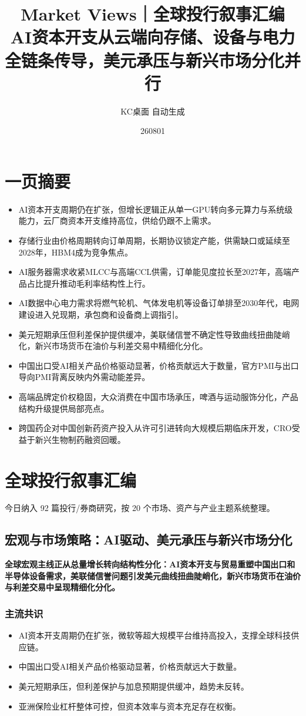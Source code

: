 \documentclass[11pt]{ctexart}
\title{\textbf{Market Views｜全球投行叙事汇编}\\[0.4em]{\large AI资本开支从云端向存储、设备与电力全链条传导，美元承压与新兴市场分化并行}}
\author{KC桌面 自动生成}
\date{260801}
\begin{document}
\maketitle
\tableofcontents
\newpage
\section{一页摘要}
\begin{itemize}
  \item AI资本开支周期仍在扩张，但增长逻辑正从单一GPU转向多元算力与系统级能力，云厂商资本开支维持高位，供给仍跟不上需求。
  \item 存储行业由价格周期转向订单周期，长期协议锁定产能，供需缺口或延续至2028年，HBM4成为竞争焦点。
  \item AI服务器需求收紧MLCC与高端CCL供需，订单能见度拉长至2027年，高端产品占比提升推动毛利率结构性上行。
  \item AI数据中心电力需求将燃气轮机、气体发电机等设备订单排至2030年代，电网建设进入兑现期，承包商和设备商上调指引。
  \item 美元短期承压但利差保护提供缓冲，美联储信誉不确定性导致曲线扭曲陡峭化，新兴市场货币在油价与利差交易中精细化分化。
  \item 中国出口受AI相关产品价格驱动显著，价格贡献远大于数量，官方PMI与出口导向PMI背离反映内外需动能差异。
  \item 高端品牌定价权稳固，大众消费在中国市场承压，啤酒与运动服饰分化，产品结构升级提供局部亮点。
  \item 跨国药企对中国创新药资产投入从许可引进转向大规模后期临床开发，CRO受益于新兴生物制药融资回暖。
\end{itemize}
\section{全球投行叙事汇编}
今日纳入 92 篇投行/券商研究，按 20 个市场、资产与产业主题系统整理。
\newpage
\subsection{宏观与市场策略：AI驱动、美元承压与新兴市场分化}
\textbf{全球宏观主线正从总量增长转向结构性分化：AI资本开支与贸易重塑中国出口和半导体设备需求，美联储信誉问题引发美元曲线扭曲陡峭化，新兴市场货币在油价与利差交易中呈现精细化分化。}
\subsubsection*{主流共识}
\begin{itemize}
  \item AI资本开支周期仍在扩张，微软等超大规模平台维持高投入，支撑全球科技供应链。
  \item 中国出口受AI相关产品价格驱动显著，价格贡献远大于数量。
  \item 美元短期承压，但利差保护与加息预期提供缓冲，趋势未反转。
  \item 亚洲保险业杠杆整体可控，但资本效率与资本充足存在权衡。
\end{itemize}
\end{document}
